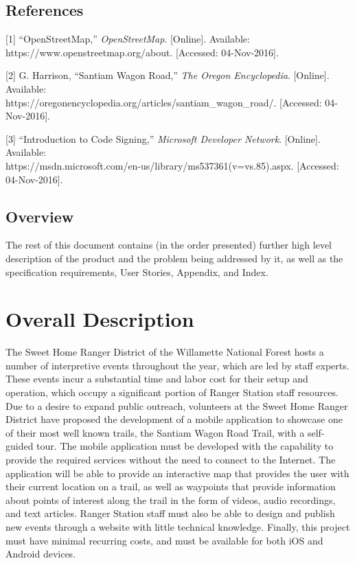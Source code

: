 \documentclass[letterpaper, 10pt,titlepage]{article}
\begin{document}
\subsection{References}

[1] “OpenStreetMap,” \textit{OpenStreetMap}. [Online]. Available: https://www.openstreetmap.org/about. [Accessed: 04-Nov-2016]. \par


[2] G. Harrison, “Santiam Wagon Road,” \textit{The Oregon Encyclopedia}. [Online]. Available: \\ https://oregonencyclopedia.org/articles/santiam\_wagon\_road/. [Accessed: 04-Nov-2016]. \par


[3] “Introduction to Code Signing,” \textit{Microsoft Developer Network}. [Online]. Available: \\ https://msdn.microsoft.com/en-us/library/ms537361(v=vs.85).aspx. [Accessed: 04-Nov-2016]. 



\vspace{0.3cm}

\subsection{Overview}
The rest of this document contains (in the order presented) further high level description of the product and the problem being addressed by it, as well as the specification requirements, User Stories, Appendix, and Index. 



\section{Overall Description}
The Sweet Home Ranger District of the Willamette National Forest hosts a number of interpretive events throughout the year, which are led by staff experts. These events incur a substantial time and labor  cost for their setup and operation, which occupy a significant portion of Ranger Station staff resources.  Due to a desire to expand public outreach, volunteers at the Sweet Home Ranger District have proposed the development of a mobile application to showcase one of their most well known trails, the Santiam Wagon Road Trail, with a self-guided tour. The mobile application must be developed with the capability to provide the required services without the need to connect to the Internet. The application will be able to provide an interactive map that provides the user with their current location on a trail, as well as waypoints that provide information about points of interest along the trail in the form of videos, audio recordings, and text articles. Ranger Station staff must also be able to design and publish new events through a website with little technical knowledge. Finally, this project must have minimal recurring costs, and must be available for both iOS and Android devices.
\end{document}
